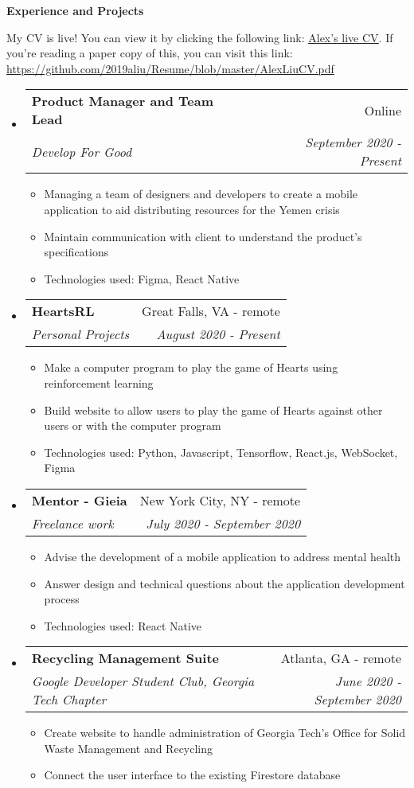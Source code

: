 \documentclass[letterpaper,11pt]{article}
\makeatletter
\newcommand{\resitem}[1]{\item #1 \vspace{-2pt}}
\newcommand{\resheading}[1]{{\large \colorbox{mygrey}{\begin{minipage}{\textwidth}{\textbf{#1 \vphantom{p\^{E}}}}\end{minipage}}}}
\newcommand{\ressubheading}[4]{
\begin{tabular*}{7.0in}{l@{\extracolsep{\fill}}r}
		\textbf{#1} & #2 \\
		\textit{#3} & \textit{#4} \\
\end{tabular*}\vspace{-6pt}}
\makeatother
\begin{document}
\resheading{Experience and Projects}

\vspace{1em}
My CV is live! You can view it by clicking the following link: \underline{\href{https://github.com/2019aliu/Resume/blob/master/AlexLiuCV.pdf}{Alex's live CV}}. If you're reading a paper copy of this, you can visit this link: \url{https://github.com/2019aliu/Resume/blob/master/AlexLiuCV.pdf}

\begin{itemize}
\item
    \ressubheading{Product Manager and Team Lead}{Online}{Develop For Good}{September 2020 - Present}
    \begin{itemize}
        \resitem{Managing a team of designers and developers to create a mobile application to aid distributing resources for the Yemen crisis}
        \resitem{Maintain communication with client to understand the product's specifications}
        \resitem{Technologies used: Figma, React Native}
    \end{itemize}
\item
    \ressubheading{HeartsRL}{Great Falls, VA - remote}{Personal Projects}{August 2020 - Present}
    \begin{itemize}
        \resitem{Make a computer program to play the game of Hearts using reinforcement learning}
        \resitem{Build website to allow users to play the game of Hearts against other users or with the computer program}
        \resitem{Technologies used: Python, Javascript, Tensorflow, React.js, WebSocket, Figma}
    \end{itemize}
\item
    \ressubheading{Mentor - Gieia}{New York City, NY - remote}{Freelance work}{July 2020 - September 2020}
    \begin{itemize}
        \resitem{Advise the development of a mobile application to address mental health}
        \resitem{Answer design and technical questions about the application development process}
        \resitem{Technologies used: React Native}
    \end{itemize}
\item
    \ressubheading{Recycling Management Suite}{Atlanta, GA - remote}{Google Developer Student Club, Georgia Tech Chapter}{June 2020 - September 2020}
    \begin{itemize}
        \resitem{Create website to handle administration of Georgia Tech's Office for Solid Waste Management and Recycling}
        \resitem{Connect the user interface to the existing Firestore database}

\end{itemize}
\end{itemize}
\end{document}
